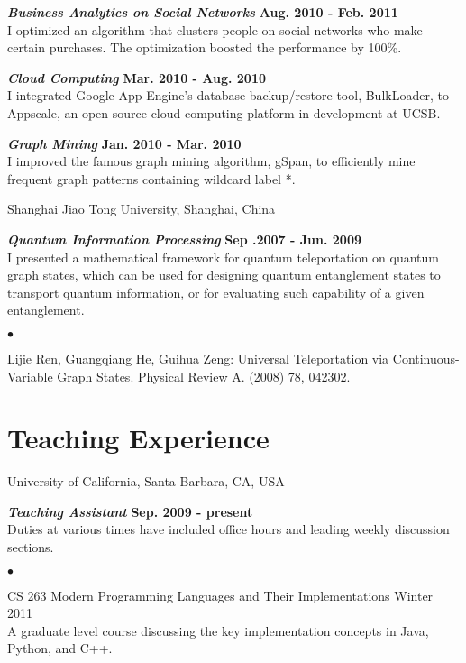 \documentclass[margin,line]{res}
\newenvironment{list2}{
  \begin{list}{$\bullet$}{%
      \setlength{\itemsep}{0in}
      \setlength{\parsep}{0in} \setlength{\parskip}{0in}
      \setlength{\topsep}{0in} \setlength{\partopsep}{0in}
      \setlength{\leftmargin}{0.2in}}}{\end{list}}
\begin{document}
\begin{resume}
{\bf{\em Business Analytics on Social Networks}}  \hfill {\bf Aug. 2010 - Feb. 2011}\\
I optimized an algorithm that clusters people on social networks who make certain purchases. The optimization boosted the performance by 100\%.

{\bf{\em Cloud Computing}}  \hfill {\bf Mar. 2010 - Aug. 2010}\\
I integrated Google App Engine's database backup/restore tool, BulkLoader, to Appscale, an open-source cloud computing platform in development at UCSB.

{\bf{\em Graph Mining}}  \hfill {\bf Jan. 2010 - Mar. 2010}\\
I improved the famous graph mining algorithm, gSpan, to efficiently mine frequent graph patterns containing wildcard label *.

{Shanghai Jiao Tong University}, Shanghai, China

\vspace{-.3cm}
{\bf{\em Quantum Information Processing}} \hfill {\bf Sep .2007 - Jun. 2009}\\
I presented a mathematical framework for quantum teleportation on quantum graph states, which can be used for designing quantum entanglement states to transport quantum information, or for evaluating such capability of a given entanglement.
\vspace*{.05in}
\begin{list2}
\item Lijie Ren, Guangqiang He, Guihua Zeng: Universal Teleportation via Continuous-Variable Graph States. Physical Review A. (2008) 78, 042302.
\end{list2}

\section{\sc Teaching Experience}
{University of California, Santa Barbara}, CA, USA

\vspace{-.3cm}
{\bf {\em Teaching Assistant}} \hfill {\bf Sep. 2009  - present}\\
Duties at various times have included office hours and leading weekly discussion sections.
\vspace*{.05in}
\begin{list2}
\item {CS 263 Modern Programming Languages and Their
Implementations} \hfill {Winter 2011}\\
A graduate level course discussing the key implementation concepts in Java, Python, and C++.


\end{list2}
\end{resume}
\end{document}
